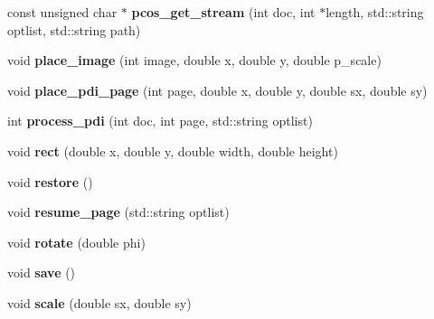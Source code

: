 \begin{DoxyCompactItemize}
\item 
\hypertarget{classPDFlib_a3a6ff19b1fd07bda95745e1f63e731f8}{const unsigned char $\ast$ {\bfseries pcos\-\_\-get\-\_\-stream} (int doc, int $\ast$length, std\-::string optlist, std\-::string path)}\label{classPDFlib_a3a6ff19b1fd07bda95745e1f63e731f8}

\item 
\hypertarget{classPDFlib_a17390ec77d9d1b476870cf72fce905aa}{void {\bfseries place\-\_\-image} (int image, double x, double y, double p\-\_\-scale)}\label{classPDFlib_a17390ec77d9d1b476870cf72fce905aa}

\item 
\hypertarget{classPDFlib_ad56800ffc54122dfde959dbd4b922331}{void {\bfseries place\-\_\-pdi\-\_\-page} (int page, double x, double y, double sx, double sy)}\label{classPDFlib_ad56800ffc54122dfde959dbd4b922331}

\item 
\hypertarget{classPDFlib_a674e04d73bfe7ae771a60114445720a0}{int {\bfseries process\-\_\-pdi} (int doc, int page, std\-::string optlist)}\label{classPDFlib_a674e04d73bfe7ae771a60114445720a0}

\item 
\hypertarget{classPDFlib_a3c9ab4d05bd6b8716d311c05c91af04a}{void {\bfseries rect} (double x, double y, double width, double height)}\label{classPDFlib_a3c9ab4d05bd6b8716d311c05c91af04a}

\item 
\hypertarget{classPDFlib_a0e73e06c50b4adfe9bdf3d206b210442}{void {\bfseries restore} ()}\label{classPDFlib_a0e73e06c50b4adfe9bdf3d206b210442}

\item 
\hypertarget{classPDFlib_ae9ae4ec9f2162c582fbd35ff9092c497}{void {\bfseries resume\-\_\-page} (std\-::string optlist)}\label{classPDFlib_ae9ae4ec9f2162c582fbd35ff9092c497}

\item 
\hypertarget{classPDFlib_a083f84661e2c6ae1af089ac7f48b3897}{void {\bfseries rotate} (double phi)}\label{classPDFlib_a083f84661e2c6ae1af089ac7f48b3897}

\item 
\hypertarget{classPDFlib_a15c53a7de05f502273b2a9e977f0b91d}{void {\bfseries save} ()}\label{classPDFlib_a15c53a7de05f502273b2a9e977f0b91d}

\item 
\hypertarget{classPDFlib_a34c2b8df5a25b153402144788f5108cf}{void {\bfseries scale} (double sx, double sy)}\label{classPDFlib_a34c2b8df5a25b153402144788f5108cf}


\end{DoxyCompactItemize}
